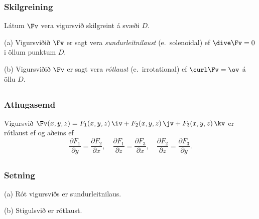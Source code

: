 \subsubsection{Skilgreining \rtask{}}
 Látum $\Fv$ vera vigursvið skilgreint á svæði $D$.  

(a) Vigursviðið $\Fv$ er sagt vera {\em sundurleitnilaust}
(e.~solenoidal) ef $\dive\Fv=0$ i öllum punktum  $D$.

(b) Vigursviðið $\Fv$ er sagt vera {\em rótlaust} (e.~irrotational) ef $\curl\Fv=\ov$ á öllu $D$.
    







\subsection{} 

\subsubsection{Athugasemd \rtask{}}
 Vigursvið   $\Fv(x,y,z)=F_1(x,y,z)\,\iv+F_2(x,y,z)\,\jv+F_3(x,y,z)\,\kv$ er rótlaust ef og aðeins ef 
$$\frac{\partial F_1}{\partial y}=
\frac{\partial F_2}{\partial x},\quad
\frac{\partial F_1}{\partial z}=
\frac{\partial F_3}{\partial x},\quad
\frac{\partial F_2}{\partial z}=
\frac{\partial F_3}{\partial y}.$$








\subsection{} 

\subsubsection{Setning \rtask{}}
 (a) Rót vigursviðs er sundurleitnilaus.

(b) Stigulsvið er rótlaust.

   \medskip







\subsection{} 


